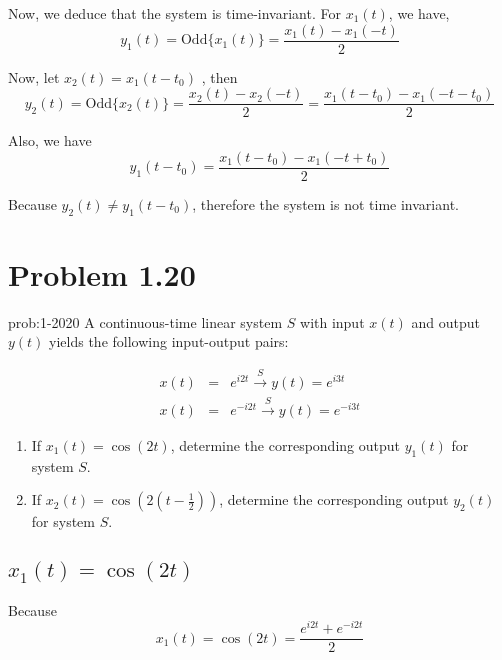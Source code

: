 \documentclass[koma,a4paper,utopia,12pt,listings-color,microtype,paralist,colorlinks,urlcolor=red]{org-article}
\begin{document}
Now, we deduce that the system is time-invariant. For \(x_{1}(t)\), we have,
\begin{equation*}
y_{1}(t) = \mathrm{Odd}\{ x_{1}(t) \} = \frac{ x_{1}(t) - x_{1}(-t) }{2}
\end{equation*}

Now, let \(x_{2}(t) = x_{1}(t-t_{0})\) , then
\begin{equation*}
y_{2}(t) = \mathrm{Odd}\{ x_{2}(t) \} = \frac{ x_{2}(t) - x_{2}(-t) }{2} = \frac{ x_{1}(t-t_{0})  - x_{1}(-t - t_{0}) }{2}
\end{equation*}

Also, we have
\begin{equation*}
y_{1}(t-t_{0}) = \frac{ x_{1}(t-t_{0}) - x_{1}(-t + t_{0}) }{2}
\end{equation*}

Because \(y_{2}(t) \neq y_{1}(t- t_{0})\), therefore the system is not time invariant.
\section{Problem 1.20}
\label{sec:org498dd64}



\begin{prob}[]{prob:1-2020}
A continuous-time linear system \(S\) with input \(x(t)\) and output
\(y(t)\) yields the following input-output pairs:

\begin{eqnarray*}
x(t)&=& e^{i2t} \xrightarrow{S} y(t) = e^{i3t} \\
x(t)&=& e^{-i2t} \xrightarrow{S} y(t) = e^{-i3t}
\end{eqnarray*}

\begin{enumerate}
\item If \(x_{1}(t) = \cos(2t)\), determine the corresponding output
\(y_{1}(t)\) for system \(S\).
\item If \(x_{2}(t) = \cos(2(t-\frac{1}{2}))\), determine the corresponding
output \(y_{2}(t)\) for system \(S\).
\end{enumerate}
\label{prob:1-2020}
\end{prob}

\subsection{\(x_{1}(t) = \cos(2t)\)}
\label{sec:org01dbb75}

Because
\begin{equation*}
x_{1}(t) = \cos(2t) = \frac{ e^{i2t} + e^{-i2t} }{2}
\end{equation*}
\end{document}
